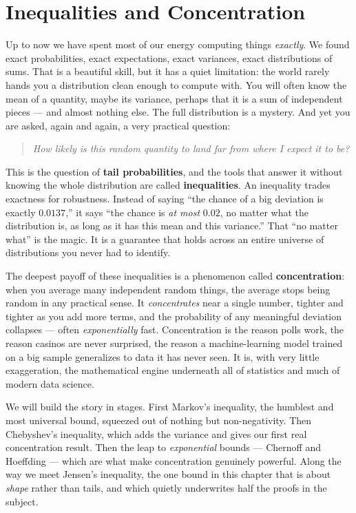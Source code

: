 \chapter{Inequalities and Concentration}

Up to now we have spent most of our energy computing things \emph{exactly}.
We found exact probabilities, exact expectations, exact variances, exact
distributions of sums. That is a beautiful skill, but it has a quiet
limitation: the world rarely hands you a distribution clean enough to compute
with. You will often know the mean of a quantity, maybe its variance, perhaps
that it is a sum of independent pieces --- and almost nothing else. The full
distribution is a mystery. And yet you are asked, again and again, a very
practical question:

\begin{quote}
\emph{How likely is this random quantity to land far from where I expect it
to be?}
\end{quote}

This is the question of \textbf{tail probabilities}, and the tools that answer
it without knowing the whole distribution are called \textbf{inequalities}. An
inequality trades exactness for robustness. Instead of saying ``the chance of
a big deviation is exactly $0.0137$,'' it says ``the chance is \emph{at most}
$0.02$, no matter what the distribution is, as long as it has this mean and
this variance.'' That ``no matter what'' is the magic. It is a guarantee that
holds across an entire universe of distributions you never had to identify.

The deepest payoff of these inequalities is a phenomenon called
\textbf{concentration}: when you average many independent random things, the
average stops being random in any practical sense. It \emph{concentrates}
near a single number, tighter and tighter as you add more terms, and the
probability of any meaningful deviation collapses --- often
\emph{exponentially} fast. Concentration is the reason polls work, the reason
casinos are never surprised, the reason a machine-learning model trained on a
big sample generalizes to data it has never seen. It is, with very little
exaggeration, the mathematical engine underneath all of statistics and much of
modern data science.

We will build the story in stages. First Markov's inequality, the humblest and
most universal bound, squeezed out of nothing but non-negativity. Then
Chebyshev's inequality, which adds the variance and gives our first real
concentration result. Then the leap to \emph{exponential} bounds --- Chernoff
and Hoeffding --- which are what make concentration genuinely powerful. Along
the way we meet Jensen's inequality, the one bound in this chapter that is
about \emph{shape} rather than tails, and which quietly underwrites half the
proofs in the subject.

